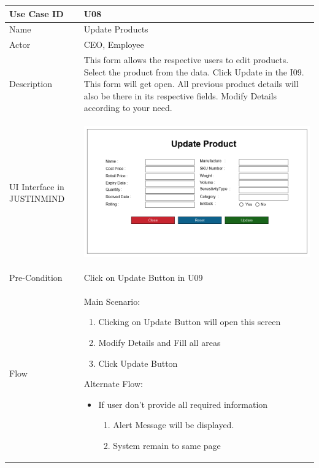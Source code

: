 \documentclass[12pt,a4paper]{report}
\begin{document}
\begin{tabular}{ | m{3cm} | m{12cm}| } \hline

Use Case ID &  U08 \\\hline

Name  	    &  Update Products \\ \hline

Actor     	&  CEO, Employee\\ \hline

Description &  This form allows the respective users to edit products. Select the product from the data. Click Update in the I09. This form will get open. All previous product details will also be there in its respective fields. Modify Details according to your need.\\ \hline

UI Interface in JUSTINMIND & \begin{center} \includegraphics[scale=0.3]{./UIs for Latex Reports/UI-009 Update Product@1x.png}\end{center}  \\ \hline

Pre-Condition &  Click on Update Button in U09 \\ \hline

Flow & Main Scenario:

\begin{enumerate}
\item   Clicking on Update Button will open this screen
\item  Modify Details and Fill all areas
\item  Click Update Button


\end{enumerate}

Alternate Flow:

\begin{itemize}
\item If user don’t provide all required information
	\begin{enumerate}
		\item Alert Message will be displayed.
		\item System remain to same page


\end{enumerate}
\end{itemize}
\end{tabular}
\end{document}
